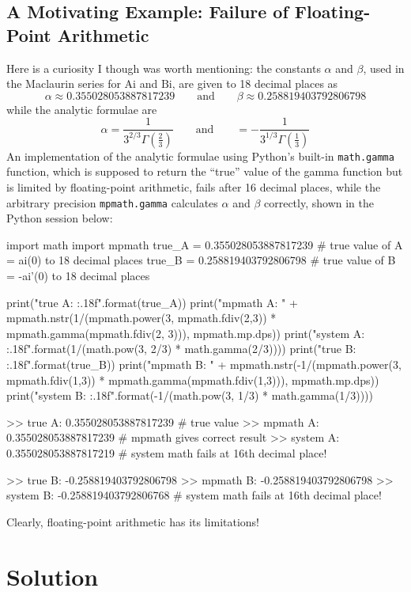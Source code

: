 \documentclass[11pt, a4paper]{article}
\newcommand{\eqtext}[1]{\qquad \text{#1} \qquad}
\newcommand{\Ai}{\mathrm{Ai}}
\newcommand{\Bi}{\mathrm{Bi}}
\begin{document}
\subsection{A Motivating Example: Failure of Floating-Point Arithmetic}
Here is a curiosity I though was worth mentioning: the constants $ \alpha $ and $ \beta $, used in the Maclaurin series for $ \Ai $ and $ \Bi $, are given to 18 decimal places as
\begin{equation*}
	\alpha \approx 0.355028053887817239 \eqtext{and} \beta \approx 0.258819403792806798	
\end{equation*}
while the analytic formulae are 
\begin{equation*}
	\alpha = \frac{1}{3^{2/3}\Gamma(\tfrac{2}{3})} \eqtext{and} = -\frac{1}{3^{1/3}\Gamma(\tfrac{1}{3})}
\end{equation*}
An implementation of the analytic formulae using Python's built-in \texttt{math.gamma} function, which is supposed to return the ``true'' value of the gamma function but is limited by floating-point arithmetic, fails after 16 decimal places, while the arbitrary precision \texttt{mpmath.gamma} calculates $ \alpha $ and $ \beta $ correctly, shown in the Python session below:
\begin{myminted}
import math
import mpmath
true_A = 0.355028053887817239     # true value of A = ai(0) to 18 decimal places
true_B = 0.258819403792806798     # true value of B = -ai'(0) to 18 decimal places

print("true A: {:.18f}".format(true_A))
print("mpmath A: " + mpmath.nstr(1/(mpmath.power(3, mpmath.fdiv(2,3)) * mpmath.gamma(mpmath.fdiv(2, 3))), mpmath.mp.dps))
print("system A: {:.18f}".format(1/(math.pow(3, 2/3) * math.gamma(2/3))))
print("true B: {:.18f}".format(true_B))
print("mpmath B: " + mpmath.nstr(-1/(mpmath.power(3, mpmath.fdiv(1,3)) * mpmath.gamma(mpmath.fdiv(1,3))), mpmath.mp.dps))
print("system B: {:.18f}".format(-1/(math.pow(3, 1/3) * math.gamma(1/3))))

>> true A:    0.355028053887817239    # true value
>> mpmath A:  0.355028053887817239    # mpmath gives correct result
>> system A:  0.355028053887817219    # system math fails at 16th decimal place!

>> true B:   -0.258819403792806798    
>> mpmath B: -0.258819403792806798    
>> system B: -0.258819403792806768    # system math fails at 16th decimal place!
\end{myminted}
Clearly, floating-point arithmetic has its limitations!

\section{Solution} \label{airy:s:solution}
\end{document}
